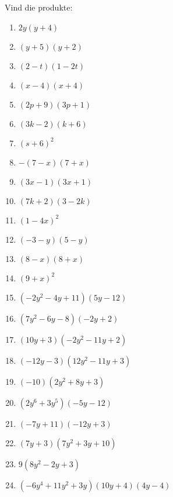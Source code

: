 \begin{exercises}{}
{

Vind die produkte:

\begin{multicols}{2}
\begin{enumerate}[label=\textbf{\arabic*}., itemsep=5pt]
\item $2y(y+4)$ 
\item $(y+5)(y+2) $
\item $(2-t)(1-2t)$
\item $(x-4)(x+4)$
\item $ (2p+9)(3p+1)$
\item $(3k-2)(k+6)$
\item $(s+6)^2$
\item $-(7-x)(7+x)$
\item $(3x-1)(3x+1)$
\item $(7k+2)(3-2k)$
\item $(1-4x)^2$
\item $(-3-y)(5-y)$
\item $(8-x)(8+x)$
\item $(9+x)^2$
\item$(-2{y}^{2}-4y+11)(5y-12)$ 
\item$(7{y}^{2}-6y-8)(-2y+2)$%
\item$(10y+3)(-2{y}^{2}-11y+2)$ 
\item$(-12y-3)(12{y}^{2}-11y+3)$%
\item$(-10)(2{y}^{2}+8y+3)$ 
\item$(2{y}^{6}+3{y}^{5})(-5y-12)$%
\item$(-7y+11)(-12y+3)$%
\item$(7y+3)(7{y}^{2}+3y+10)$%
\item$9(8{y}^{2}-2y+3)$ 
\item \small$(-6{y}^{4}+11{y}^{2}+3y)(10y+4)(4y-4)$ 
\end{enumerate}
\end{multicols}

}
\end{exercises}
